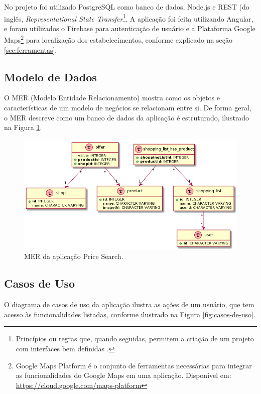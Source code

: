  No projeto foi utilizado PostgreSQL como banco de dados, Node.js e REST (do inglês, \textit{Representational State Transfer}\footnote{Princípios ou regras que, quando seguidas, permitem a criação de um projeto com interfaces bem definidas \cite{pires2017rest}.}. A aplicação foi feita utilizando Angular, e foram utilizados o Firebase para autenticação de usuário e a Plataforma Google Maps\footnote{Google Maps Platform é o conjunto de ferramentas necessárias para integrar as funcionalidades do Google Maps em uma aplicação. Disponível em: \url{https://cloud.google.com/maps-platform}} para localização dos estabelecimentos, conforme explicado na seção \ref{sec:ferramentas}.
 
\subsection{Modelo de Dados}
 
 O MER (Modelo Entidade Relacionamento) mostra como os objetos e características de um modelo de negócios se relacionam entre si. De forma geral, o MER descreve como um banco de dados da aplicação é estruturado, ilustrado na Figura \ref{fig:mer}.
 
 
\begin{figure}[!htb]
\centering
\includegraphics[width=\linewidth]{figuras/MER.png}
\caption{MER da aplicação Price Search.}
\label{fig:mer}
\end{figure}
 
  
 \subsection{Casos de Uso}
O diagrama de casos de uso da aplicação ilustra as ações de um usuário, que tem acesso às funcionalidades listadas, conforme ilustrado na Figura \ref{fig:casos-de-uso}.

